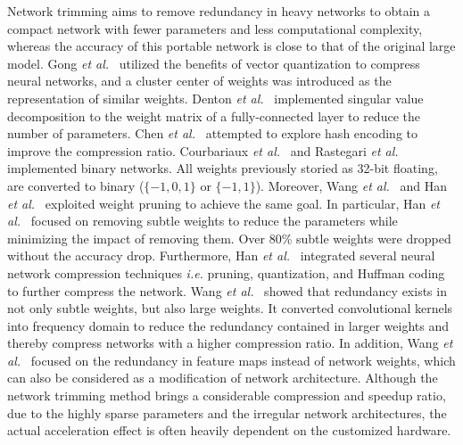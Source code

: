 \documentclass[journal]{IEEEtran}
\begin{document}
Network trimming aims to remove redundancy in heavy networks to obtain a compact network with fewer parameters and less computational complexity, whereas the accuracy of this portable network is close to that of the original large model.
Gong \emph{et al.}~\cite{gong2014compressing} utilized the benefits of vector quantization to compress neural networks, and a cluster center of weights was introduced as the representation of similar weights. 
Denton \emph{et al.}~\cite{denton2014exploiting} implemented singular value decomposition to the weight matrix of a fully-connected layer to reduce the number of parameters. 
Chen \emph{et al.}~\cite{chen2015compressing} attempted to explore hash encoding to improve the compression ratio. 
Courbariaux \emph{et al.}~\cite{courbariaux2016binarized} and Rastegari \emph{et al.}~\cite{rastegari2016xnor} implemented binary networks. All weights previously storied as 32-bit floating, are converted to binary ($\{-1, 0, 1\}$ or $\{-1, 1\}$).
Moreover, Wang \emph{et al.}~\cite{wang2016cnnpack} and Han \emph{et al.}~\cite{han2015learning} exploited weight pruning to achieve the same goal. In particular, Han \emph{et al.}~\cite{han2015learning} focused on removing subtle weights to reduce the parameters while minimizing the impact of removing them. Over 80\% subtle weights were dropped without the accuracy drop. Furthermore, Han \emph{et al.}~\cite{han2015deep} integrated several neural network compression techniques \emph{i.e.} pruning, quantization, and Huffman coding to further compress the network. Wang \emph{et al.}~\cite{wang2016cnnpack} showed that redundancy exists in not only subtle weights, but also large weights. It converted convolutional kernels into frequency domain to reduce the redundancy contained in larger weights and thereby compress networks with a higher compression ratio. In addition, Wang \emph{et al.}~\cite{wang2017beyond} focused on the redundancy in feature maps instead of network weights, which can also be considered as a modification of network architecture. Although the network trimming method brings a considerable compression and speedup ratio, due to the highly sparse parameters and the irregular network architectures, the actual acceleration effect is often heavily dependent on the customized hardware.
\end{document}
